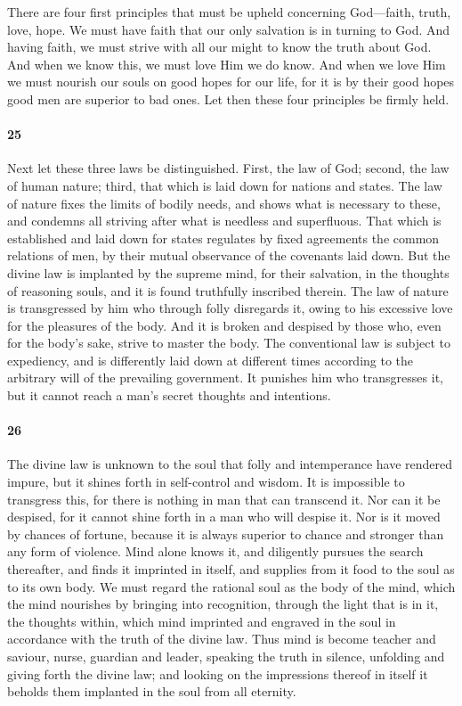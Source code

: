 \documentclass[12pt]{article}
\begin{document}
There are four first principles that must be upheld concerning God---faith,
truth, love, hope. We must have faith that our only salvation is in turning to
God. And having faith, we must strive with all our might to know the truth
about God. And when we know this, we must love Him we do know. And when we love
Him we must nourish our souls on good hopes for our life, for it is by their
good hopes good men are superior to bad ones. Let then these four principles be
firmly held.

\paragraph{25} Next let these three laws be distinguished. First, the law of
God; second, the law of human nature; third, that which is laid down for
nations and states. The law of nature fixes the limits of bodily needs, and
shows what is necessary to these, and condemns all striving after what is
needless and superfluous. That which is established and laid down for states
regulates by fixed agreements the common relations of men, by their mutual
observance of the covenants laid down. But the divine law is implanted by the
supreme mind, for their salvation, in the thoughts of reasoning souls, and it
is found truthfully inscribed therein. The law of nature is transgressed by him
who through folly disregards it, owing to his excessive love for the pleasures
of the body. And it is broken and despised by those who, even for the body's
sake, strive to master the body. The conventional law is subject to expediency,
and is differently laid down at different times according to the arbitrary will
of the prevailing government. It punishes him who transgresses it, but it
cannot reach a man's secret thoughts and intentions.

\paragraph{26} The divine law is unknown to the soul that folly and
intemperance have rendered impure, but it shines forth in self-control and
wisdom. It is impossible to transgress this, for there is nothing in man that
can transcend it. Nor can it be despised, for it cannot shine forth in a man
who will despise it. Nor is it moved by chances of fortune, because it is
always superior to chance and stronger than any form of violence. Mind alone
knows it, and diligently pursues the search thereafter, and finds it imprinted
in itself, and supplies from it food to the soul as to its own body. We must
regard the rational soul as the body of the mind, which the mind nourishes by
bringing into recognition, through the light that is in it, the thoughts
within, which mind imprinted and engraved in the soul in accordance with the
truth of the divine law. Thus mind is become teacher and saviour, nurse,
guardian and leader, speaking the truth in silence, unfolding and giving forth
the divine law; and looking on the impressions thereof in itself it beholds
them implanted in the soul from all eternity.
\end{document}
